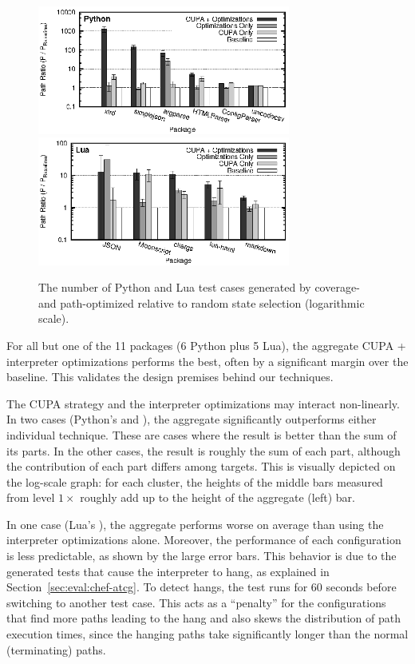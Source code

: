 \begin{figure}[t]
  \centering
  \includegraphics[width=3.27in]{figures/evaluation/bkdown-path-python} \\
  \includegraphics[width=3.27in]{figures/evaluation/bkdown-path-lua}
  \caption{The number of Python and Lua test cases generated by
    coverage- and path-optimized \cupa relative to random state
    selection (logarithmic scale).}
  \label{fig:tc-improv}
\end{figure}

For all but one of the 11 packages (6 Python plus 5 Lua), the aggregate CUPA + interpreter optimizations performs the best, often by a significant margin over the baseline.  This validates the design premises behind our techniques.

The CUPA strategy and the interpreter optimizations may interact non-linearly.  In two cases (Python's  and ), the aggregate significantly outperforms either individual technique. These are cases where the result is better than the sum of its parts.  In the other cases, the result is roughly the sum of each part, although the contribution of each part differs among targets.  This is visually depicted on the log-scale graph: for each cluster, the heights of the middle bars measured from level $1 \times$ roughly add up to the height of the aggregate (left) bar.

In one case (Lua's ), the aggregate performs worse on average than using the interpreter optimizations alone.  Moreover, the performance of each configuration is less predictable, as shown by the large error bars.  This behavior is due to the generated tests that cause the interpreter to hang, as explained in Section~\ref{sec:eval:chef-atcg}.  To detect hangs, the test runs for 60 seconds before switching to another test case.  This acts as a ``penalty'' for the configurations that find more paths leading to the hang and also skews the distribution of path execution times, since the hanging paths take significantly longer than the normal (terminating) paths.

